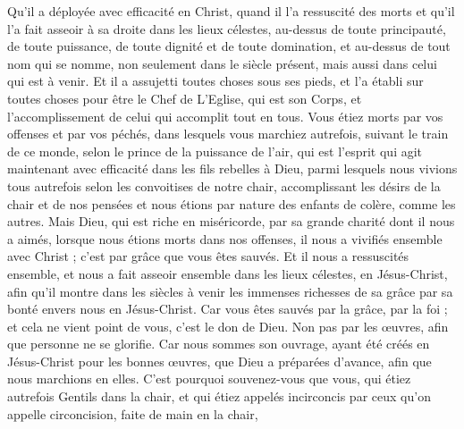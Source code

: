 \begin{multicols}{2}
Qu'il a déployée avec efficacité en Christ, quand il l'a ressuscité des morts et qu'il l'a fait asseoir à sa droite dans les lieux célestes,
au-dessus de toute principauté, de toute puissance, de toute dignité et de toute domination, et au-dessus de tout nom qui se nomme, non seulement dans le siècle présent, mais aussi dans celui qui est à venir.
Et il a assujetti toutes choses sous ses pieds, et l'a établi sur toutes choses pour être le Chef de L'Eglise,
qui est son Corps, et l'accomplissement de celui qui accomplit tout en tous.
\VerseOne{}Vous étiez morts par vos offenses et par vos péchés,
dans lesquels vous marchiez autrefois, suivant le train de ce monde, selon le prince de la puissance de l'air, qui est l'esprit qui agit maintenant avec efficacité dans les fils rebelles à Dieu,
parmi lesquels nous vivions tous autrefois selon les convoitises de notre chair, accomplissant les désirs de la chair et de nos pensées et nous étions par nature des enfants de colère, comme les autres.
Mais Dieu, qui est riche en miséricorde, par sa grande charité dont il nous a aimés,
lorsque nous étions morts dans nos offenses, il nous a vivifiés ensemble avec Christ ; c'est par grâce que vous êtes sauvés.
Et il nous a ressuscités ensemble, et nous a fait asseoir ensemble dans les lieux célestes, en Jésus-Christ,
afin qu'il montre dans les siècles à venir les immenses richesses de sa grâce par sa bonté envers nous en Jésus-Christ.
Car vous êtes sauvés par la grâce, par la foi ; et cela ne vient point de vous, c'est le don de Dieu.
Non pas par les œuvres, afin que personne ne se glorifie.
Car nous sommes son ouvrage, ayant été créés en Jésus-Christ pour les bonnes œuvres, que Dieu a préparées d'avance, afin que nous marchions en elles.
C’est pourquoi souvenez-vous que vous, qui étiez autrefois Gentils dans la chair, et qui étiez appelés incirconcis par ceux qu'on appelle circoncision, faite de main en la chair,



\end{multicols}
